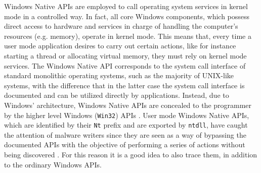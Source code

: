 \documentclass[binding=0.6cm,LaM,english,noexaminfo,oneside]{sapthesis} %
\begin{document}
Windows Native APIs are employed to call operating system services in kernel mode in a controlled way.  
In fact, all core Windows components, which possess direct access to hardware and services in charge of handling the computer's resources (e.g. memory), operate in kernel mode. This means that, every time a user mode application desires to carry out certain actions, like for instance starting a thread or allocating virtual memory, they must rely on kernel mode  services. The Windows Native API corresponds to the system call interface of standard monolithic operating systems, such as the majority of UNIX-like systems, with the difference that in the latter case the system call interface is documented and can be utilized directly by applications. Instead, due to Windows' architecture, Windows Native APIs are concealed to the programmer by the higher level Windows (\texttt{Win32}) APIs \cite{NTAPI1}. User mode Windows Native APIs, which are identified by their \texttt{Nt} prefix and are exported by \texttt{ntdll}, have caught the attention of malware writers since they are seen as a way of bypassing the documented APIs with the objective of performing a series of actions without being discovered \cite{NTAPI2}. For this reason it is a good idea to also trace them, in addition to the ordinary Windows APIs.  
\end{document}
